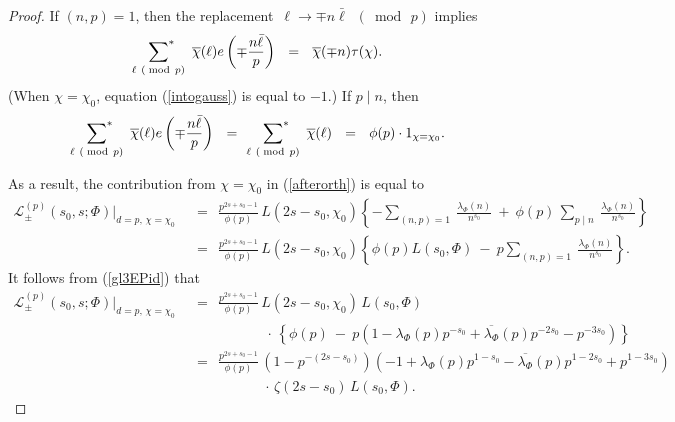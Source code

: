\documentclass[11pt,reqno]{amsart}
\theoremstyle{definition}
\theoremstyle{definition}
\theoremstyle{remark}
\numberwithin{equation}{section}
\begin{document}
\begin{proof}
	If $(n,p)=1$, then the replacement\,   $\ell \to \mp n\bar{\ell}$\, $(\bmod\, p)$ implies 
	\begin{align}\label{intogauss}
		\sideset{}{^*}{\sum}_{\ell \ (\bmod\, p)}  \ \overline{\chi}(\ell) 	e\left(\mp \frac{n\bar{\ell}}{p}\right) \ \ =  \ \  \overline{\chi}(\mp n) \tau(\chi). 
	\end{align}
 (When $\chi=\chi_{0}$, equation (\ref{intogauss}) is equal to $-1$.) If  $p\mid n$, then
	\begin{align*}
		\sideset{}{^*}{\sum}_{\ell \ (\bmod\, p)}  \ \overline{\chi}(\ell) 	e\left(\mp \frac{n\bar{\ell}}{p}\right) \ \ = \  \  	\sideset{}{^*}{\sum}_{\ell \ (\bmod\, p)}  \ \overline{\chi}(\ell)  \ \ = \ \  \phi(p)\cdot  1_{\chi=\chi_{0}}. 
	\end{align*}
	
	As a result, the contribution from $\chi=\chi_{0}$ in (\ref{afterorth}) is equal to 
	\begin{align}
			\mathcal{L}^{(p)}_{\pm}\left(s_{0}, s; \Phi\right) \bigg|_{d=p, \, \chi=\chi_{0}}   \ \ &= \  \   \frac{p^{2s+s_{0}-1}}{\phi(p)} \,  L(2s-s_{0}, \chi_{0})  \left\{ -\sum_{(n,p)=1} \ \frac{\lambda_{\Phi}(n)}{n^{s_{0}}}  \ + \ \phi(p) \, \sum_{p\mid n} \ \frac{\lambda_{\Phi}(n)}{n^{s_{0}}}   \right\} \nonumber\\
		\ \ &= \ \     \frac{p^{2s+s_{0}-1}}{\phi(p)} \,  L(2s-s_{0}, \chi_{0})  \left\{  \phi(p) L(s_{0}, \Phi) \ - \  p \sum_{(n,p)=1} \ \frac{\lambda_{\Phi}(n)}{n^{s_{0}}} \right\}. \nonumber
	\end{align}
	It follows from (\ref{gl3EPid}) that
	\begin{align}
			\mathcal{L}^{(p)}_{\pm}\left(s_{0}, s; \Phi\right) \bigg|_{d=p, \, \chi=\chi_{0}} 	\ \ &= \  \     \frac{p^{2s+s_{0}-1}}{\phi(p)} \,  L(2s-s_{0}, \chi_{0})  \, L(s_{0}, \Phi) \nonumber\\
		& \hspace{60pt} \,  \cdot \,  \left\{  \phi(p) \ - \  p   \left(1-\lambda_{\Phi}(p)p^{-s_{0}} +\overline{\lambda_{\Phi}}(p)p^{-2s_{0}}-p^{-3s_{0}}\right) \right\}  \nonumber\\
		\ \ &= \  \  \frac{p^{2s+s_{0}-1}}{\phi(p)} \, (1-p^{-(2s-s_{0})}) \left(-1 +\lambda_{\Phi}(p)p^{1-s_{0}}- \overline{\lambda_{\Phi}}(p) p^{1-2s_{0}}+p^{1-3s_{0}}\right) \nonumber\\
		&\hspace{60pt} \cdot \,  \zeta(2s-s_{0}) \, L(s_{0}, \Phi). \nonumber
	\end{align}
	

\end{proof}
\end{document}
